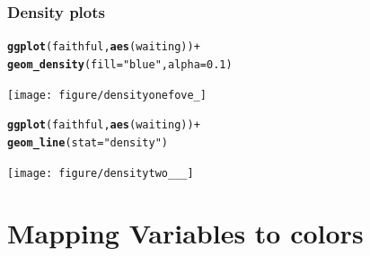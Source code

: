 \documentclass{beamer}\usepackage[]{graphicx}\usepackage[]{color}
\makeatletter
\newcommand{\hlstr}[1]{\textcolor[rgb]{0.192,0.494,0.8}{#1}}%
\newcommand{\hlkwd}[1]{\textcolor[rgb]{0.737,0.353,0.396}{\textbf{#1}}}%
\newenvironment{kframe}{%
 \def\at@end@of@kframe{}%
 \ifinner\ifhmode%
  \def\at@end@of@kframe{\end{minipage}}%
  \begin{minipage}{\columnwidth}%
 \fi\fi%
 \def\FrameCommand##1{\hskip\@totalleftmargin \hskip-\fboxsep
 \colorbox{shadecolor}{##1}\hskip-\fboxsep
     \hskip-\linewidth \hskip-\@totalleftmargin \hskip\columnwidth}%
 \MakeFramed {\advance\hsize-\width
   \@totalleftmargin\z@ \linewidth\hsize
   \@setminipage}}%
 {\par\unskip\endMakeFramed%
 \at@end@of@kframe}
\newenvironment{knitrout}{}{} %
\makeatother
\begin{document}

\begin{frame}[fragile]
\frametitle{Density plots}
\begin{knitrout}\footnotesize
{}\color{fgcolor}\begin{kframe}
\begin{alltt}
\hlkwd{ggplot}(faithful, \hlkwd{aes}(waiting)) +
\hlkwd{geom_density}(fill = \hlstr{"blue"}, alpha = 0.1)
\end{alltt}
\end{kframe}

{\centering \texttt{[image: figure/densityonefove\_]} 

}



\end{knitrout}

\end{frame}


\begin{frame}[fragile]
\begin{knitrout}\footnotesize
{}\color{fgcolor}\begin{kframe}
\begin{alltt}
\hlkwd{ggplot}(faithful, \hlkwd{aes}(waiting)) +
\hlkwd{geom_line}(stat = \hlstr{"density"})
\end{alltt}
\end{kframe}

{\centering \texttt{[image: figure/densitytwo\_\_\_]} 

}



\end{knitrout}

\end{frame}


\section*{Mapping Variables to colors}
\frame{\sectionpage}

\end{document}
